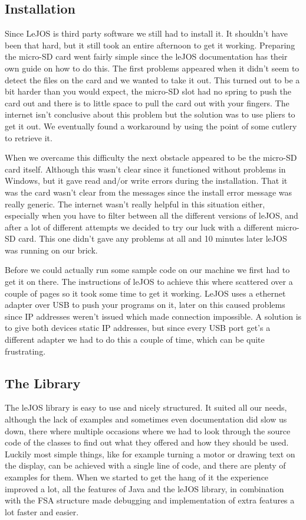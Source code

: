 \subsection{Installation}
Since LeJOS is third party software we still had to install it. It shouldn't have been that hard, but it still took an entire afternoon to get it working. Preparing the micro-SD card went fairly simple since the leJOS documentation has their own guide on how to do this. The first problems appeared when it didn't seem to detect the files on the card and we wanted to take it out. This turned out to be a bit harder than you would expect, the micro-SD slot had no spring to push the card out and there is to little space to pull the card out with your fingers. The internet isn't conclusive about this problem but the solution was to use pliers to get it out. We eventually found a workaround by using the point of some cutlery to retrieve it.

When we overcame this difficulty the next obstacle appeared to be the micro-SD card itself. Although this wasn't clear since it functioned without problems in Windows, but it gave read and/or write errors during the installation. That it was the card wasn't clear from the messages since the install error message was really generic. The internet wasn't really helpful in this situation either, especially when you have to filter between all the different versions of leJOS, and after a lot of different attempts we decided to try our luck with a different micro-SD card. This one didn't gave any problems at all and 10 minutes later leJOS was running on our brick.

Before we could actually run some sample code on our machine we first had to get it on there. The instructions of leJOS to achieve this where scattered over a couple of pages so it took some time to get it working. LeJOS uses a ethernet adapter over USB to push your programs on it, later on this caused problems since IP addresses weren't issued which made connection impossible. A solution is to give both devices static IP addresses, but since every USB port get's a different adapter we had to do this a couple of time, which can be quite frustrating.

\subsection{The Library}
The leJOS library is easy to use and nicely structured. It suited all our needs, although the lack of examples and sometimes even documentation did slow us down, there where multiple occasions where we had to look through the source code of the classes to find out what they offered and how they should be used. Luckily most simple things, like for example turning a motor or drawing text on the display, can be achieved with a single line of code, and there are plenty of examples for them. When we started to get the hang of it the experience improved a lot, all the features of Java and the leJOS library, in combination with the FSA structure made debugging and implementation of extra features a lot faster and easier.

